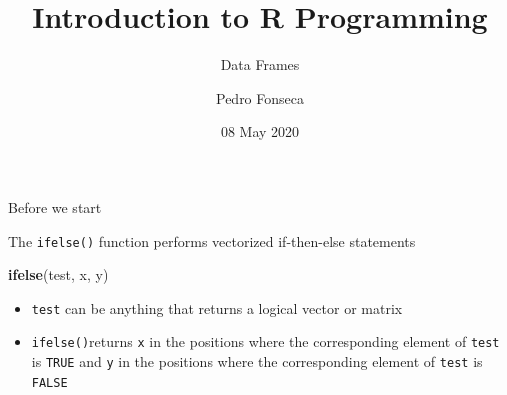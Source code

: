 \documentclass[ignorenonframetext,]{beamer}
\title{Introduction to R Programming}
\subtitle{Data Frames}
\author{Pedro Fonseca}
\date{08 May 2020}
\newenvironment{Shaded}{\begin{snugshade}}{\end{snugshade}}
\newcommand{\KeywordTok}[1]{\textcolor[rgb]{0.13,0.29,0.53}{\textbf{#1}}}
\newcommand{\NormalTok}[1]{#1}
\begin{document}
\frame{\titlepage}

\begin{frame}[fragile]{Before we start}
\protect\hypertarget{before-we-start}{}

The \texttt{ifelse()} function performs vectorized if-then-else
statements

\begin{Shaded}
\begin{Highlighting}[]
\KeywordTok{ifelse}\NormalTok{(test, x, y)}
\end{Highlighting}
\end{Shaded}

\begin{itemize}
\item
  \texttt{test} can be anything that returns a logical vector or matrix
\item
  \texttt{ifelse()}returns \texttt{x} in the positions where the
  corresponding element of \texttt{test} is \texttt{TRUE} and \texttt{y}
  in the positions where the corresponding element of \texttt{test} is
  \texttt{FALSE}
\end{itemize}

\end{frame}
\end{document}
